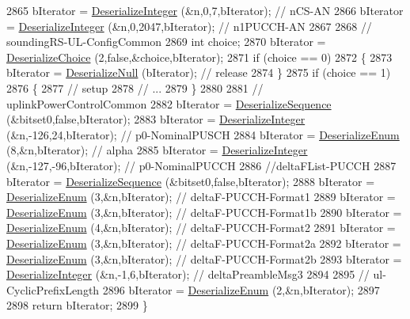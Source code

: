 \begin{DoxyCode}
2865   bIterator = \hyperlink{classns3_1_1Asn1Header_a49802c9af30018b078150e866b6ecae2}{DeserializeInteger} (&n,0,7,bIterator); \textcolor{comment}{// nCS-AN }
2866   bIterator = \hyperlink{classns3_1_1Asn1Header_a49802c9af30018b078150e866b6ecae2}{DeserializeInteger} (&n,0,2047,bIterator); \textcolor{comment}{// n1PUCCH-AN }
2867 
2868   \textcolor{comment}{// soundingRS-UL-ConfigCommon}
2869   \textcolor{keywordtype}{int} choice;
2870   bIterator = \hyperlink{classns3_1_1Asn1Header_a0af5881f07a0549a8693a1b75c229a90}{DeserializeChoice} (2,\textcolor{keyword}{false},&choice,bIterator);
2871   \textcolor{keywordflow}{if} (choice == 0)
2872     \{
2873       bIterator = \hyperlink{classns3_1_1Asn1Header_a29bd4508f3f1ef636b3480f524fac0ce}{DeserializeNull} (bIterator); \textcolor{comment}{// release}
2874     \}
2875   \textcolor{keywordflow}{if} (choice == 1)
2876     \{
2877       \textcolor{comment}{// setup}
2878       \textcolor{comment}{// ...}
2879     \}
2880 
2881   \textcolor{comment}{// uplinkPowerControlCommon }
2882   bIterator = \hyperlink{classns3_1_1Asn1Header_a58c68bb97ba3fe2e8fcdd7c208d672b2}{DeserializeSequence} (&bitset0,\textcolor{keyword}{false},bIterator);
2883   bIterator = \hyperlink{classns3_1_1Asn1Header_a49802c9af30018b078150e866b6ecae2}{DeserializeInteger} (&n,-126,24,bIterator); \textcolor{comment}{// p0-NominalPUSCH}
2884   bIterator = \hyperlink{classns3_1_1Asn1Header_a4fcc253e0eec3483c775b005c1875f2d}{DeserializeEnum} (8,&n,bIterator); \textcolor{comment}{// alpha }
2885   bIterator = \hyperlink{classns3_1_1Asn1Header_a49802c9af30018b078150e866b6ecae2}{DeserializeInteger} (&n,-127,-96,bIterator); \textcolor{comment}{// p0-NominalPUCCH }
2886   \textcolor{comment}{//deltaFList-PUCCH }
2887   bIterator = \hyperlink{classns3_1_1Asn1Header_a58c68bb97ba3fe2e8fcdd7c208d672b2}{DeserializeSequence} (&bitset0,\textcolor{keyword}{false},bIterator);
2888   bIterator = \hyperlink{classns3_1_1Asn1Header_a4fcc253e0eec3483c775b005c1875f2d}{DeserializeEnum} (3,&n,bIterator); \textcolor{comment}{// deltaF-PUCCH-Format1 }
2889   bIterator = \hyperlink{classns3_1_1Asn1Header_a4fcc253e0eec3483c775b005c1875f2d}{DeserializeEnum} (3,&n,bIterator); \textcolor{comment}{// deltaF-PUCCH-Format1b }
2890   bIterator = \hyperlink{classns3_1_1Asn1Header_a4fcc253e0eec3483c775b005c1875f2d}{DeserializeEnum} (4,&n,bIterator); \textcolor{comment}{// deltaF-PUCCH-Format2 }
2891   bIterator = \hyperlink{classns3_1_1Asn1Header_a4fcc253e0eec3483c775b005c1875f2d}{DeserializeEnum} (3,&n,bIterator); \textcolor{comment}{// deltaF-PUCCH-Format2a }
2892   bIterator = \hyperlink{classns3_1_1Asn1Header_a4fcc253e0eec3483c775b005c1875f2d}{DeserializeEnum} (3,&n,bIterator); \textcolor{comment}{// deltaF-PUCCH-Format2b}
2893   bIterator = \hyperlink{classns3_1_1Asn1Header_a49802c9af30018b078150e866b6ecae2}{DeserializeInteger} (&n,-1,6,bIterator); \textcolor{comment}{// deltaPreambleMsg3 }
2894  
2895   \textcolor{comment}{// ul-CyclicPrefixLength}
2896   bIterator = \hyperlink{classns3_1_1Asn1Header_a4fcc253e0eec3483c775b005c1875f2d}{DeserializeEnum} (2,&n,bIterator);
2897 
2898   \textcolor{keywordflow}{return} bIterator;
2899 \}
\end{DoxyCode}


